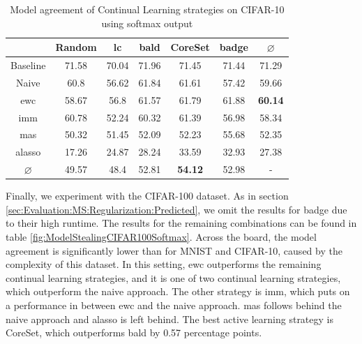 \begin{table}[h]
    \centering
    \begin{tabular}{ c | c c c c c | c } 
         & Random & \gls{lc} & \gls{bald} & CoreSet & \gls{badge} & $\varnothing$\\ 
        \hline 
        Baseline & 71.58 & 70.04 & 71.96 & 71.45 & 71.44 & 71.29\\
        \hline
        Naive & 60.8 & 56.62 & 61.84 & 61.61 & 57.42 & 59.66 \\
        \gls{ewc} & 58.67 & 56.8 & 61.57 & 61.79 & 61.88 & \textbf{60.14}\\
        \gls{imm} & 60.78 & 52.24 & 60.32 & 61.39 & 56.98 & 58.34 \\
        \gls{mas} & 50.32 & 51.45 & 52.09 & 52.23 & 55.68 & 52.35\\
        \gls{alasso} & 17.26 & 24.87 & 28.24 & 33.59 & 32.93 & 27.38\\
        \hline
        $\varnothing$ & 49.57 & 48.4 & 52.81 & \textbf{54.12} & 52.98 & -\\
    \end{tabular}
    \caption{Model agreement of Continual Learning strategies on CIFAR-10 using softmax output}
    \label{fig:ModelStealingCIFAR10Softmax}
\end{table}


Finally, we experiment with the CIFAR-100 dataset. As in section \ref{sec:Evaluation:MS:Regularization:Predicted}, we omit the results for \gls{badge} due to their high runtime.
The results for the remaining combinations can be found in table \ref{fig:ModelStealingCIFAR100Softmax}. Across the board, the model agreement is
significantly lower than for MNIST and CIFAR-10, caused by the complexity of this dataset. In this setting,
\gls{ewc} outperforms the remaining continual learning strategies, and it is one of two continual learning strategies, which outperform the naive approach.
The other strategy is \gls{imm}, which puts on a performance in between \gls{ewc} and the naive approach. \gls{mas} follows behind the naive approach
and \gls{alasso} is left behind. The best active learning strategy is CoreSet, which outperforms \gls{bald} by 0.57 percentage points.\par

